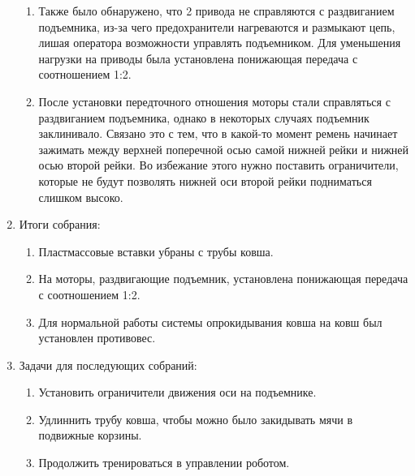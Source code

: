 \begin{enumerate}
\begin{enumerate}
      \item Также было обнаружено, что 2 привода не справляются с раздвиганием подъемника, из-за чего предохранители нагреваются и размыкают цепь, лишая оператора возможности управлять подъемником. Для уменьшения нагрузки на приводы была установлена понижающая передача с соотношением 1:2.
      
      
      \item После установки передточного отношения моторы стали справляться с раздвиганием подъемника, однако в некоторых случаях подъемник заклинивало. Связано это с тем, что в какой-то момент ремень начинает зажимать между верхней поперечной осью самой нижней рейки и нижней осью второй рейки. Во избежание этого нужно поставить ограничители, которые не будут позволять нижней оси второй рейки подниматься слишком высоко.
          
    \end{enumerate}
    
	\item Итоги собрания: 
	\begin{enumerate}
	  \item Пластмассовые вставки убраны с трубы ковша. 
	  
      \item На моторы, раздвигающие подъемник, установлена понижающая передача с соотношением 1:2.
      
      \item Для нормальной работы системы опрокидывания ковша на ковш был установлен противовес.
    \end{enumerate}
    
	\item Задачи для последующих собраний:
	\begin{enumerate}
	  \item Установить ограничители движения оси на подъемнике.
	  
	  \item Удлиннить трубу ковша, чтобы можно было закидывать мячи в подвижные корзины.
	  
	  \item Продолжить тренироваться в управлении роботом.

    \end{enumerate}     
\end{enumerate}
\fillpage